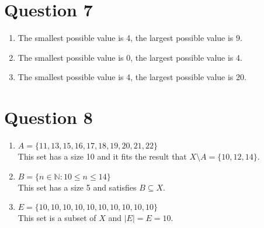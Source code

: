 \documentclass[11pt, oneside]{article}   	%
\begin{document}
\section*{Question 7}

	\begin{enumerate}
		\item The smallest possible value is 4, the largest possible value is 9.
		\item The smallest possible value is 0, the largest possible value is 4.
		\item The smallest possible value is 4, the largest possible value is 20.
	\end{enumerate}

\section*{Question 8}

	\begin{enumerate}
		\item $A = \{11, 13, 15, 16, 17, 18, 19, 20, 21, 22\}$\\This set has a size 10 and it fits the result that $X \setminus A = \{10, 12, 14\}$.
		\item $B = \{n\in \mathbb{N} : 10 \leq n \leq 14\}$\\This set has a size 5 and satisfies $B \subseteq X$.
		\item $E = \{10, 10, 10, 10, 10, 10, 10, 10, 10, 10\}$\\This set is a subset of $X$ and $\left\lvert E\right\rvert = E = 10$.
	\end{enumerate}
\end{document}
